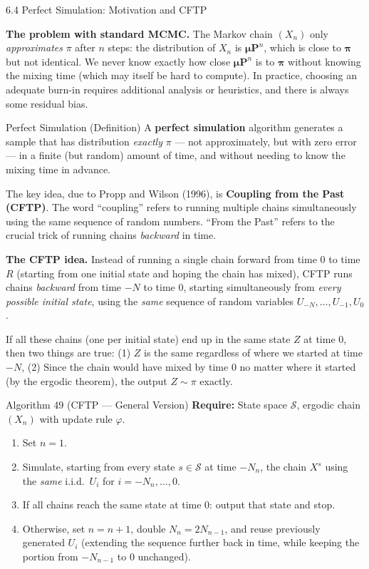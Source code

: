 \documentclass[aspectratio=169,10pt]{beamer}
\newcommand{\bfP}{\mathbf{P}}
\newcommand{\bfpi}{\bm{\pi}}
\newcommand{\bfmu}{\bm{\mu}}
\begin{document}
\begin{frame}[allowframebreaks]{6.4 Perfect Simulation: Motivation and CFTP}

\textbf{The problem with standard MCMC.}
The Markov chain $(X_n)$ only \emph{approximates} $\pi$ after $n$ steps: the distribution of $X_n$ is $\bfmu \bfP^n$, which is close to $\bfpi$ but not identical.
We never know exactly how close $\bfmu \bfP^n$ is to $\bfpi$ without knowing the mixing time (which may itself be hard to compute).
In practice, choosing an adequate burn-in requires additional analysis or heuristics, and there is always some residual bias.

\begin{block}{Perfect Simulation (Definition)}
A \textbf{perfect simulation} algorithm generates a sample that has distribution \emph{exactly} $\pi$ --- not approximately, but with zero error --- in a finite (but random) amount of time, and without needing to know the mixing time in advance.
\end{block}

The key idea, due to Propp and Wilson (1996), is \textbf{Coupling from the Past (CFTP)}.
The word ``coupling'' refers to running multiple chains simultaneously using the same sequence of random numbers.
``From the Past'' refers to the crucial trick of running chains \emph{backward} in time.

\framebreak

\textbf{The CFTP idea.}
Instead of running a single chain forward from time $0$ to time $R$ (starting from one initial state and hoping the chain has mixed), CFTP runs chains \emph{backward} from time $-N$ to time $0$, starting simultaneously from \emph{every possible initial state}, using the \emph{same} sequence of random variables $U_{-N}, \ldots, U_{-1}, U_0$.

If all these chains (one per initial state) end up in the same state $Z$ at time $0$, then two things are true:
(1) $Z$ is the same regardless of where we started at time $-N$,
(2) Since the chain would have mixed by time 0 no matter where it started (by the ergodic theorem), the output $Z \sim \pi$ exactly.

\begin{block}{Algorithm 49 (CFTP --- General Version)}
\textbf{Require:} State space $\mathcal{S}$, ergodic chain $(X_n)$ with update rule $\varphi$.
\begin{enumerate}
  \item Set $n = 1$.
  \item Simulate, starting from every state $s \in \mathcal{S}$ at time $-N_n$, the chain $X^s$ using the \emph{same} i.i.d.\ $U_i$ for $i = -N_n, \ldots, 0$.
  \item If all chains reach the same state at time 0: output that state and stop.
  \item Otherwise, set $n = n+1$, double $N_n = 2N_{n-1}$, and reuse previously generated $U_i$ (extending the sequence further back in time, while keeping the portion from $-N_{n-1}$ to $0$ unchanged).
\end{enumerate}
\end{block}


\end{frame}
\end{document}
